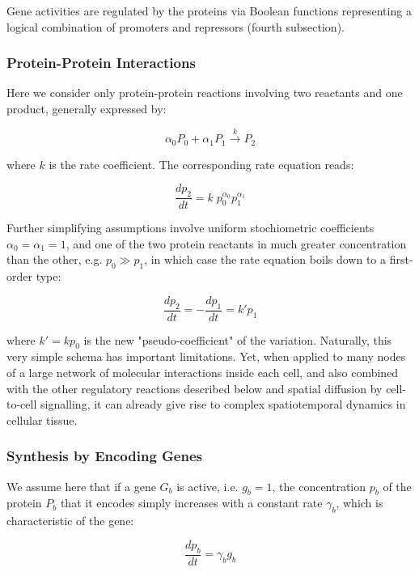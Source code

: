 Gene activities are regulated by the proteins via Boolean functions representing a logical combination of promoters and repressors (fourth subsection).


\subsubsection{Protein-Protein Interactions}


Here we consider only protein-protein reactions involving two reactants and one product, generally expressed by:

$$\alpha_0 P_0 + \alpha_1 P_1 \overset{k}{\rightarrow} P_2$$

where $k$ is the rate coefficient. The corresponding rate equation reads:  

$$\frac{dp_2}{dt} = k\;p_0^{\alpha_0} p_1^{\alpha_1}$$

Further simplifying assumptions involve uniform stochiometric coefficients $\alpha_0 = \alpha_1 = 1$, and one of the two protein reactants in much greater concentration than the other, e.g. $p_0 \gg p_1$, in which case the rate equation boils down to a first-order type:

$$\frac{dp_2}{dt} = -\frac{dp_1}{dt} = k' p_1$$

where $k' = kp_0$ is the new "pseudo-coefficient" of the variation. Naturally, this very simple schema has important limitations. Yet, when applied to many nodes of a large network of molecular interactions inside each cell, and also combined with the other regulatory reactions described below and spatial diffusion by cell-to-cell signalling, it can already give rise to complex spatiotemporal dynamics in cellular tissue.


\subsubsection{Synthesis by Encoding Genes}


We assume here that if a gene $G_b$ is active, i.e. $g_b = 1$, the concentration $p_b$ of the protein $P_b$ that it encodes simply increases with a constant rate $\gamma_b$, which is characteristic of the gene:

$$\frac{dp_b}{dt} = \gamma_b g_b$$


